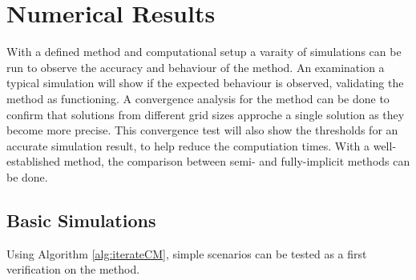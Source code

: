 \section{Numerical Results}

  With a defined method and computational setup a varaity of simulations can be run to observe the accuracy and behaviour of the method.
  An examination a typical simulation will show if the expected behaviour is observed, validating the method as functioning.
  A convergence analysis for the method can be done to confirm that solutions from different grid sizes approche a single solution as they become more precise.
  This convergence test will also show the thresholds for an accurate simulation result, to help reduce the computiation times.
  With a well-established method, the comparison between semi- and fully-implicit methods can be done.

\subsection{Basic Simulations}

  Using Algorithm \ref{alg:iterateCM}, simple scenarios can be tested as a first verification on the method.

  
